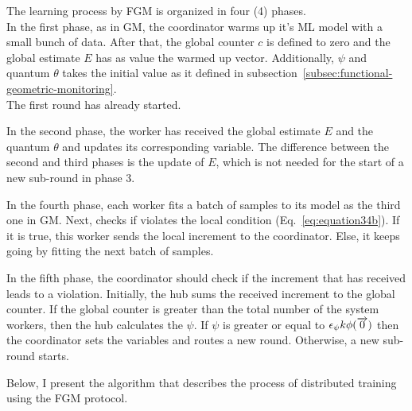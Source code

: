 \newpage

The learning process by FGM is organized in four (4) phases. \\
In the first phase, as in GM, the coordinator warms up it's ML model with a small bunch of data.
After that, the global counter $c$ is defined to zero and the global estimate $E$ has as value the warmed up vector.
Additionally, $\psi$ and quantum $\theta$ takes the initial value as it defined in subsection~\ref{subsec:functional-geometric-monitoring}. \\
The first round has already started.

In the second phase, the worker has received the global estimate $E$ and the quantum $\theta$ and updates its corresponding variable.
The difference between the second and third phases is the update of $E$, which is not needed for the start of a new sub-round in phase 3.


In the fourth phase, each worker fits a batch of samples to its model as the third one in GM.
Next, checks if violates the local condition (Eq.~\ref{eq:equation34b}).
If it is true, this worker sends the local increment to the coordinator.
Else, it keeps going by fitting the next batch of samples.

In the fifth phase, the coordinator should check if the increment that has received leads to a violation.
Initially, the hub sums the received increment to the global counter.
If the global counter is greater than the total number of the system workers, then the hub calculates the $\psi$.
If $\psi$ is greater or equal to $\epsilon_\psi k \phi(\overrightarrow{\rm 0})$ then the coordinator sets the variables and routes a new round.
Otherwise, a new sub-round starts.

\vspace{1cm}

Below, I present the algorithm that describes the process of distributed training using the FGM protocol.


